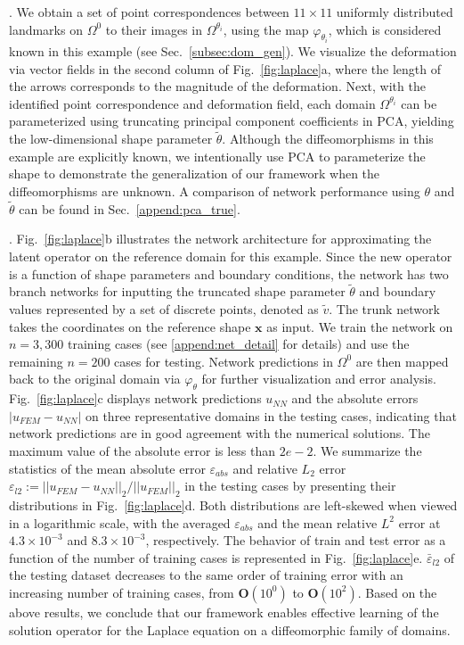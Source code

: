 \documentclass[review]{elsarticle}
\def\Omegathetai{{\Omega^{\theta_i}}}
\def\refd{0}
\def\Omegaref{{\Omega^\refd}}
\begin{document}
. We obtain a set of point correspondences between $11\times11$ uniformly distributed landmarks on $\Omegaref$ to their images in $\Omegathetai$, using the map $\varphi_{\theta_i}$, which is considered known in this example (see Sec.~\ref{subsec:dom_gen}). We visualize the deformation via vector fields in the second column of Fig.~\ref{fig:laplace}a, where the length of the arrows corresponds to the magnitude of the deformation. Next, with the identified point correspondence and deformation field, each domain $\Omegathetai$ can be parameterized using truncating principal component coefficients in PCA, yielding the low-dimensional shape parameter $\tilde{\theta}$.
Although the diffeomorphisms in this example are explicitly known, we intentionally use PCA to parameterize the shape to demonstrate the generalization of our framework when the diffeomorphisms are unknown. 
A comparison of network performance using $\theta$ and $\tilde{\theta}$ can be found in Sec.~\ref{append:pca_true}.

. Fig.~\ref{fig:laplace}b illustrates the network architecture for approximating the latent operator on the reference domain for this example. Since the new operator is a function of shape parameters and boundary conditions, the network has two branch networks for inputting the truncated shape parameter $\tilde{\theta}$ and boundary values represented by a set of discrete points, denoted as $\tilde v$. The trunk network takes the coordinates on the reference shape ${\mathbf{x}}$ as input. We train the network on $n=3,300$ training cases (see \ref{append:net_detail} for details) and use the remaining $n=200$ cases for testing. Network predictions in $\Omegaref$ are then mapped back to the original domain via $\varphi_\theta$ for further visualization and error analysis.
Fig.~\ref{fig:laplace}c displays network predictions $u_{NN}$ and the absolute errors $|u_{FEM} - u_{NN}|$ on three representative domains in the testing cases, indicating that network predictions are in good agreement with the numerical solutions. The maximum value of the absolute error is less than $2e-2$. We summarize the statistics of the mean absolute error $\varepsilon_{abs}$ and relative $L_2$ error $\varepsilon_{l2}:=||u_{FEM}- u_{NN}||_2/||u_{FEM}||_2$ in the testing cases by presenting their distributions in Fig.~\ref{fig:laplace}d. Both distributions are left-skewed when viewed in a logarithmic scale, with the averaged $\varepsilon_{abs}$ and the mean relative $L^{2}$ error at $4.3\times 10^{-3}$ and $8.3\times10^{-3}$, respectively. 
The behavior of train and test error as a function of the number of training cases is represented in Fig.~\ref{fig:laplace}e. $\bar \varepsilon_{l2}$ of the testing dataset decreases to the same order of training error with an increasing number of training cases, from $\mathbf{O}(10^{0})$ to $\mathbf{O}(10^{2})$. Based on the above results, we conclude that our framework enables effective learning of the solution operator for the Laplace equation on a diffeomorphic family of domains. 
\end{document}
